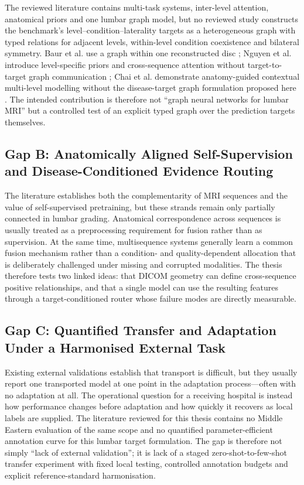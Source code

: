 The reviewed literature contains multi-task systems, inter-level attention,
anatomical priors and one lumbar graph model, but no reviewed study constructs the
benchmark's level--condition--laterality targets as a heterogeneous graph with typed
relations for adjacent levels, within-level condition coexistence and bilateral
symmetry. Baur et al. use a graph within one reconstructed disc
\cite{baur2024automated}; Nguyen et al. introduce level-specific priors and
cross-sequence attention without target-to-target graph communication
\cite{nguyen2026crossspine}; Chai et al. demonstrate anatomy-guided contextual
multi-level modelling without the disease-target graph formulation proposed here
\cite{chai2026anatomy}. The intended contribution is therefore not ``graph neural
networks for lumbar MRI'' but a controlled test of an explicit typed graph over the
prediction targets themselves.

\subsection{Gap B: Anatomically Aligned Self-Supervision and Disease-Conditioned Evidence Routing}
\label{sec:intro-gap-sequence}

The literature establishes both the complementarity of MRI sequences and the value
of self-supervised pretraining, but these strands remain only partially connected in
lumbar grading. Anatomical correspondence across sequences is usually treated as a
preprocessing requirement for fusion rather than as supervision. At the same time,
multisequence systems generally learn a common fusion mechanism rather than a
condition- and quality-dependent allocation that is deliberately challenged under
missing and corrupted modalities. The thesis therefore tests two linked ideas: that
DICOM geometry can define cross-sequence positive relationships, and that a single
model can use the resulting features through a target-conditioned router whose
failure modes are directly measurable.

\subsection{Gap C: Quantified Transfer and Adaptation Under a Harmonised External Task}
\label{sec:intro-gap-transfer}

Existing external validations establish that transport is difficult, but they
usually report one transported model at one point in the adaptation process---often
with no adaptation at all. The operational question for a receiving hospital is
instead how performance changes before adaptation and how quickly it recovers as
local labels are supplied. The literature reviewed for this thesis contains no
Middle Eastern evaluation of the same scope and no quantified parameter-efficient
annotation curve for this lumbar target formulation. The gap is therefore not
simply ``lack of external validation''; it is lack of a staged zero-shot-to-few-shot
transfer experiment with fixed local testing, controlled annotation budgets and
explicit reference-standard harmonisation.

